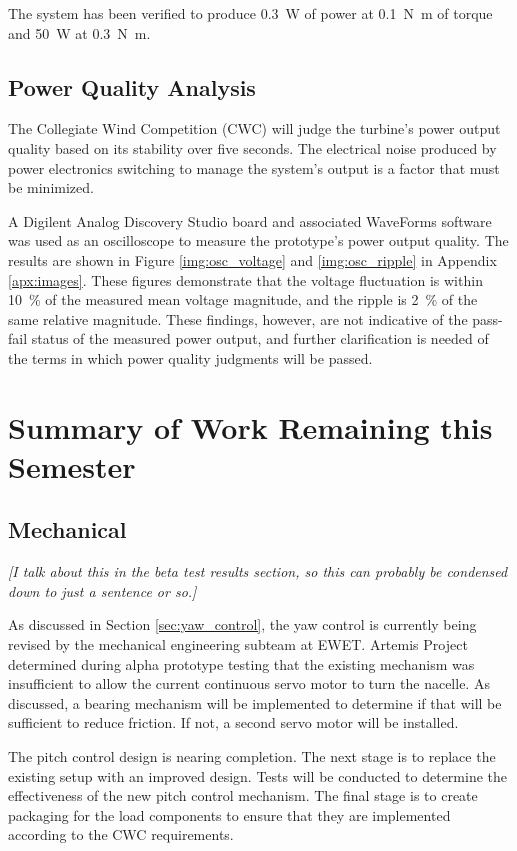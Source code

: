 \documentclass[11pt,letterpaper,conference]{IEEEtran}
\begin{document}
The system has been verified to produce \qty{.3}{\W} of power at
\qty{.1}{\newton\m} of torque and \qty{50}{\W} at \qty{.3}{\newton\m}.

\subsection{Power Quality Analysis}

The Collegiate Wind Competition (CWC) will judge the turbine's power output
quality based on its stability over five seconds. The electrical noise produced
by power electronics switching to manage the system's output is a factor that
must be minimized.

A Digilent Analog Discovery Studio board and associated WaveForms software was
used as an oscilloscope to measure the prototype's power output quality. The
results are shown in Figure \ref{img:osc_voltage} and \ref{img:osc_ripple} in
Appendix \ref{apx:images}. These figures demonstrate that the voltage
fluctuation is within \qty{10}{\percent} of the measured mean voltage
magnitude, and the ripple is \qty{2}{\percent} of the same relative magnitude.
These findings, however, are not indicative of the pass-fail status of the
measured power output, and further clarification is needed of the terms in which
power quality judgments will be passed.

\section{Summary of Work Remaining this Semester}
\subsection{Mechanical}

\emph{[I talk about this in the beta test results section, so this can probably
            be condensed down to just a sentence or so.]}

As discussed in Section \ref{sec:yaw_control}, the yaw control is currently
being revised by the mechanical engineering subteam at EWET. Artemis Project
determined during alpha prototype testing that the existing mechanism was
insufficient to allow the current continuous servo motor to turn the nacelle.
As discussed, a bearing mechanism will be implemented to determine if that
will be sufficient to reduce friction. If not, a second servo motor will be
installed.

The pitch control design is nearing completion. The next stage is to replace
the existing setup with an improved design. Tests will be conducted to
determine the effectiveness of the new pitch control mechanism. The final stage
is to create packaging for the load components to ensure that they are
implemented according to the CWC requirements.
\end{document}
